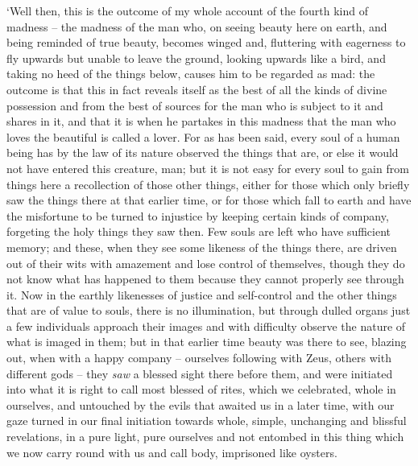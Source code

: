 ‘Well then, this is the outcome of my whole account of the 
fourth kind of madness -- the madness of the man who, on seeing beauty
here on earth, and being reminded of true beauty, becomes winged and,
fluttering with eagerness to fly upwards but unable to leave the ground,
looking upwards like a bird, and taking no heed of the things below,
causes him to be  regarded as mad: the outcome is that
this in fact reveals itself as the best of all the kinds of divine
possession and from the best of sources for the man who is subject to it
and shares in it, and that it is when he partakes in this madness that
the man who loves the
beautiful is called a
lover. For as has been said, every soul of a human being has by the law
of its nature  observed the things that are, or else it would
not have entered this creature, man; but it is not easy for every soul
to gain from things here a recollection of those other things, either
for those which only briefly saw the things there at that earlier time,
or for those which fall to earth and have the misfortune to be turned to
injustice by keeping certain kinds of company, forgeting  the
holy things they saw then. Few souls are left who have sufficient
memory; and these, when they see some likeness of the things there, are
driven out of their wits with amazement and lose control of themselves,
though they do not know what  has happened to them because they
cannot properly see through it. Now in the earthly likenesses of justice
and self-control and the other things that are of value to souls, there
is no illumination, but through dulled organs just a few individuals
approach their images and with difficulty observe the nature of what is
 imaged in them; but in that earlier time beauty was there to
see, blazing out, when with a happy company --
ourselves following with
Zeus, others with different gods -- they {\em saw} a blessed sight there
before them, and were initiated into what it is right to call most
blessed of rites, which we celebrated, whole  in ourselves, and
untouched by the evils that awaited us in a later time, with our gaze
turned in our final initiation towards whole, simple, unchanging and
blissful revelations, in a pure light, pure ourselves and not entombed
in this thing which we  now carry round with us and call body,
imprisoned like oysters.

